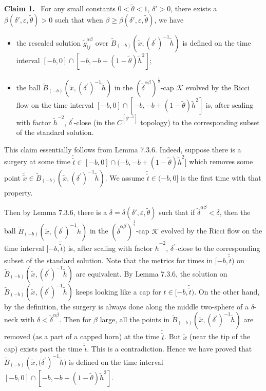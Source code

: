 \medskip
{\bf Claim 1.} \ For any small constants $0<\tilde{\theta}<1$,
$\delta'>0$, there exists a $\beta(\delta',\varepsilon,
\tilde{\theta})> 0$ such that when $\beta \geq
\beta(\delta',\varepsilon, \tilde{\theta})$, we have
\begin{itemize}
\item[(i)] the rescaled solution
$\widetilde{g}^{\alpha\beta}_{ij}$ over
$\widetilde{B}_{(-b)}(\tilde{x},{(\delta^{\prime})}^{-1}
\tilde{h})$  is defined on the time interval
$[-b,0]\cap[-b,-b+(1-\tilde{\theta})\tilde{h}^{2}]$; \item[(ii)]
the ball
$\widetilde{B}_{(-b)}(\tilde{x},{(\delta^{\prime})}^{-1}\tilde{h})$
in the ${(\widetilde{\delta}^{\alpha\beta})}^{\frac{1}{2}}$-cap
$\mathcal{K}$ evolved by the Ricci flow  on the time interval
$[-b,0]\cap[-b,-b+(1-\tilde{\theta})\tilde{h}^{2}]$ is, after
scaling with factor $\tilde{h}^{-2}$, ${\delta}^{\prime}$-close
(in the $C^{[\delta'^{-1}]}$ topology) to the corresponding subset
of the standard solution.
\end{itemize}

\medskip
This claim essentially follows from Lemma 7.3.6. Indeed, suppose
there is a surgery at some time $\tilde{\tilde{t}}\in
[-b,0]\cap(-b,-b+(1-\tilde{\theta})\tilde{h}^{2}]$ which removes
some point  $\tilde{\tilde{x}}\in \widetilde
B_{(-b)}(\tilde{x},{(\delta^{\prime})}^{-1}\tilde{h})$. We assume
$\tilde{\tilde{t}}\in (-b,0]$ is the first time with that
property.

Then by Lemma 7.3.6, there is a
$\bar{\delta}=\bar{\delta}(\delta',\varepsilon,\tilde{\theta})$
such that if $\widetilde{\delta}^{\alpha\beta}<\bar{\delta}$, then
the ball
$\widetilde{B}_{(-b)}(\tilde{x},{(\delta^{\prime})}^{-1}\tilde{h})$
in the ${(\widetilde{\delta}^{\alpha\beta})}^{\frac{1}{2}}$-cap
$\mathcal{K}$ evolved by the Ricci flow  on the time interval
$[-b,\tilde{\tilde{t}})$ is, after scaling with factor
$\tilde{h}^{-2}$, ${\delta}^{\prime}$-close to the corresponding
subset of the standard solution. Note that the metrics for times
in $[-b,\tilde{\tilde{t}})$ on $\widetilde
B_{(-b)}(\tilde{x},{(\delta^{\prime})}^{-1}\tilde{h})$  are
equivalent. By Lemma 7.3.6, the solution on $\widetilde
B_{(-b)}(\tilde{x},{(\delta^{\prime})}^{-1}\tilde{h})$ keeps
looking like a cap for $t\in [-b,\tilde{\tilde{t}})$. On the other
hand, by the definition, the surgery is always done along the
middle two-sphere of a $\delta$-neck with $\delta <
\widetilde{\delta}^{\alpha\beta}$. Then for $\beta$ large, all the
points in $\widetilde
B_{(-b)}(\tilde{x},{(\delta^{\prime})}^{-1}\tilde{h})$ are removed
(as a part of a capped horn) at the time $\tilde{\tilde{t}}$. But
$\tilde{x}$ (near the tip of the cap) exists past the time
$\tilde{\tilde{t}}$. This is a contradiction. Hence we have proved
that
$\widetilde{B}_{(-b)}(\tilde{x},{(\delta^{\prime}})^{-1}\tilde{h})$
is defined on the time interval
$[-b,0]\cap[-b,-b+(1-\tilde{\theta})\tilde{h}^{2}]$.

